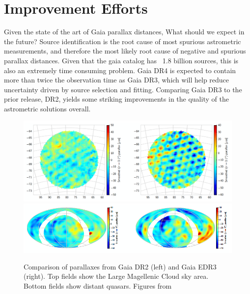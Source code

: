 \documentclass[preprint2]{aastex631}
\begin{document}
\section{Improvement Efforts} \label{sec:improvement}

Given the state of the art of Gaia parallax distances, What should we expect in the future? Source identification is the root cause of most spurious astrometric measurements, and therefore the most likely root cause of negative and spurious parallax distances. Given that the gaia catalog has ~1.8 billion sources, this is also an extremely time consuming problem. Gaia DR4 is expected to contain more than twice the observation time as Gaia DR3, which will help reduce uncertainty driven by source selection and fitting\citep{lindegrenGaia2021a}. Comparing Gaia DR3 to the prior release, DR2, yields some striking improvements in the quality of the astrometric solutions overall.
\begin{figure}
	\includegraphics[width=\columnwidth]{lmcDR2vsDR3crop.png}
	\includegraphics[width=\columnwidth]{quasarcrop.png}
	\caption{Comparison of parallaxes from Gaia DR2 (left) and Gaia EDR3 (right). Top fields show the Large Magellenic Cloud sky area. Bottom fields show distant quasars. Figures from \cite{lindegrenGaia2021a}}
	\label{fig:compare}
\end{figure}
\end{document}
